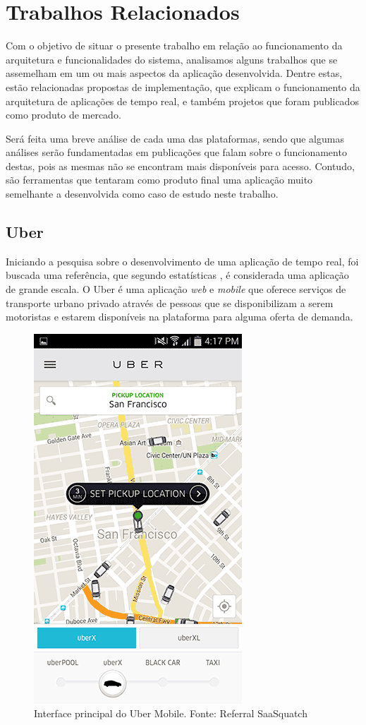 \chapter{Trabalhos Relacionados}
Com o objetivo de situar o presente trabalho em relação ao funcionamento da arquitetura e funcionalidades do sistema, analisamos alguns trabalhos que se assemelham em um ou mais aspectos da aplicação desenvolvida. Dentre estas, estão relacionadas propostas de implementação, que explicam o funcionamento da arquitetura de aplicações de tempo real, e também projetos que foram publicados como produto de mercado.

Será feita uma breve análise de cada uma das plataformas, sendo que algumas análises serão fundamentadas em publicações que falam sobre o funcionamento destas, pois as mesmas não se encontram mais disponíveis para acesso. Contudo, são ferramentas que tentaram como produto final uma aplicação muito semelhante a desenvolvida como caso de estudo neste trabalho.

\section{Uber}
Iniciando a pesquisa sobre o desenvolvimento de uma aplicação de tempo real, foi buscada uma referência, que segundo estatísticas \cite{uber-statistics}, é considerada uma aplicação de grande escala. O Uber \cite{uber} é uma aplicação \textit{web} e \textit{mobile} que oferece serviços de transporte urbano privado através de pessoas que se disponibilizam a serem motoristas e estarem disponíveis na plataforma para alguma oferta de demanda.

\begin{figure}[!b]
	\centering
	\includegraphics[scale=0.6]{imagens/uber.png}
	\caption{\small Interface principal do Uber Mobile. Fonte: Referral SaaSquatch \cite{uber-imgs}}
	\label{fig:uber-main-interface}
\end{figure}

